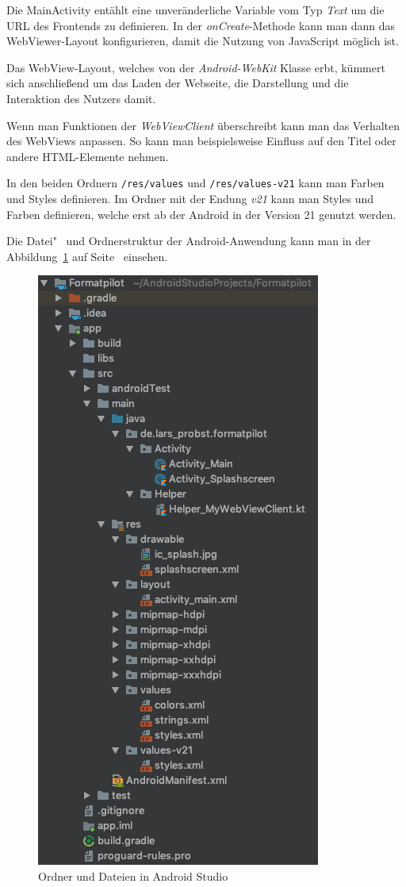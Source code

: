 Die MainActivity entählt eine unveränderliche Variable vom Typ \textit{Text} um die URL des Frontends zu definieren. In
der \textit{onCreate}-Methode kann man dann das WebViewer-Layout konfigurieren, damit die Nutzung von JavaScript möglich
ist.

Das WebView-Layout, welches von der \textit{Android-WebKit} Klasse erbt, kümmert sich anschließend um das Laden der
Webseite, die Darstellung und die Interaktion des Nutzers damit.

Wenn man Funktionen der \textit{WebViewClient} überschreibt kann man das Verhalten des WebViews anpassen. So kann man
beispielsweise Einfluss auf den Titel oder andere HTML-Elemente nehmen.

In den beiden Ordnern \texttt{/res/values} und \texttt{/res/values-v21} kann man Farben und Styles definieren. Im Ordner
mit der Endung \textit{v21} kann man Styles und Farben definieren, welche erst ab der Android in der Version 21 genutzt
werden.

Die Datei"~ und Ordnerstruktur der Android-Anwendung kann man in der Abbildung~\ref{fig:umsetzung_android_folder} auf
Seite~\pageref{fig:umsetzung_android_folder} einsehen.

\begin{figure}[h]
    \centering
    \includegraphics[scale=0.3]{images/kapitel_4/android_folder.png}
    \caption{Ordner und Dateien in Android Studio}
    \label{fig:umsetzung_android_folder}
\end{figure}

